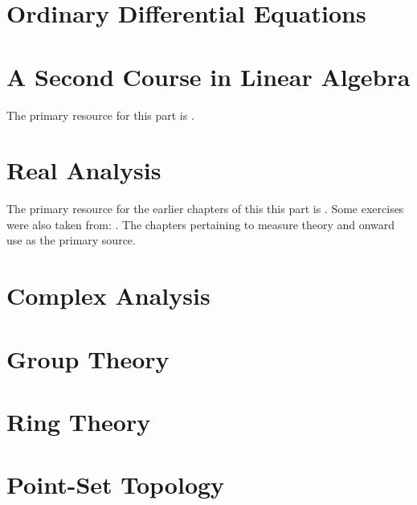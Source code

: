 \documentclass[10pt,twoside=false,open=any,numbers=noenddot]{scrbook}
\begin{document}
\part{Ordinary Differential Equations}
\label{part: Ordinary Differential Equations}
\parttoc


\part{A Second Course in Linear Algebra}
\label{Proof Based Linear Algebra}
\vspace*{2em} The primary resource for this part is \cite{ref:axler_linalg}. \vspace*{-1em}
\parttoc


\part{Real Analysis}
\vspace*{2em} The primary resource for the earlier chapters of this this part is \cite{ref:rudin_pma}. Some exercises were also taken from: \cite{ref:lee_topological}. The chapters pertaining to measure theory and onward use \cite{ref:axler_measure} as the primary source.\vspace*{-1em}
\label{Real Analysis}
\parttoc



\part{Complex Analysis}
\label{Complex Analysis}
\parttoc



\part{Group Theory}
\label{Group Theory}
\parttoc


\part{Ring Theory}
\label{Ring Theory}
\parttoc



\part{Point-Set Topology}
\label{part: Point-Set Topology}
\parttoc

\end{document}
